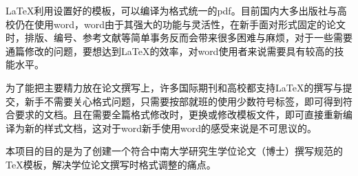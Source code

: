 
\begin{abstractcn}\setlength{\baselineskip}{20pt}%
LaTeX利用设置好的模板，可以编译为格式统一的pdf。目前国内大多出版社与高校仍在使用word，word由于其强大的功能与灵活性，在新手面对形式固定的论文时，排版、编号、参考文献等简单事务反而会带来很多困难与麻烦，对于一些需要通篇修改的问题，要想达到LaTeX的效率，对word使用者来说需要具有较高的技能水平。

为了能把主要精力放在论文撰写上，许多国际期刊和高校都支持LaTeX的撰写与提交，新手不需要关心格式问题，只需要按部就班的使用少数符号标签，即可得到符合要求的文档。且在需要全篇格式修改时，更换或修改模板文件，即可直接重新编译为新的样式文档，这对于word新手使用word的感受来说是不可思议的。

本项目的目的是为了创建一个符合中南大学研究生学位论文（博士）撰写规范的TeX模板，解决学位论文撰写时格式调整的痛点。
\end{abstractcn}